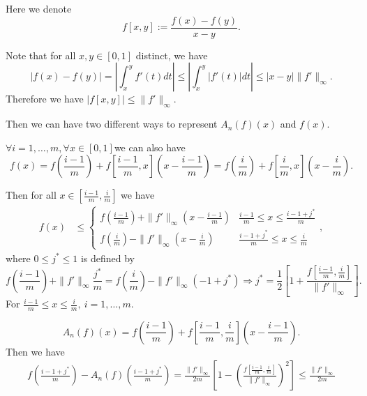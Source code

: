 Here we denote
$$f[x,y]:=\frac{f(x)-f(y)}{x-y}.$$

 Note that for all $x,y \in [0,1]$ distinct, we have
 $$|f(x)-f(y)|=\left|\int_{x}^{y}f'(t)dt\right|\leq \left|\int_{x}^{y}\left|f'(t)\right|dt\right|
 \leq |x-y|\|f'\|_{\infty}.$$
 Therefore we have $|f[x,y]|\leq \|f'\|_{\infty}.$
 
Then we can have two different ways to represent $A_{n}(f)(x)$ and $f(x).$ 

$\forall i=1,\ldots,m, \forall x \in [0,1]$we can also have
 $$f(x)=f\left(\frac{i-1}{m}\right)+f\left[\frac{i-1}{m},x\right]\left(x-\frac{i-1}{m}\right)=f\left(\frac{i}{m}\right)+f\left[\frac{i}{m},x\right]\left(x-\frac{i}{m}\right).$$



  Then for all $x \in \left[\frac{i-1}{m},\frac{i}{m}\right]$ we have
  \begin{align*}
  f(x)
  & \leq \left\{\begin{matrix}
  f\left(\frac{i-1}{m}\right)+\|f'\|_{\infty}\left(x-\frac{i-1}{m}\right) & \frac{i-1}{m} \leq x \leq \frac{i-1+j^{*}}{m} \\
  f\left(\frac{i}{m}\right)-\|f'\|_{\infty}\left(x-\frac{i}{m}\right) & \frac{i-1+j^{*}}{m} \leq x \leq \frac{i}{m}
  \end{matrix},\right.
  \end{align*}
where $0 \leq j^{*} \leq 1$ is defined by
$$f\left(\frac{i-1}{m}\right)+\|f'\|_{\infty}\frac{j^{*}}{m}=f\left(\frac{i}{m}\right)-\|f'\|_{\infty}\left(-1+j^{*}\right)
\Rightarrow j^{*}=\frac{1}{2}\left[1+\frac{f\left[\frac{i-1}{m},\frac{i}{m}\right]}{\|f'\|_{\infty}}\right].$$
For $\frac{i-1}{m} \leq x \leq \frac{i}{m}, \ i=1, \ldots, m.$

$$A_{n}(f)(x)=f\left(\frac{i-1}{m}\right)+f\left[\frac{i-1}{m},\frac{i}{m}\right]\left(x-\frac{i-1}{m}\right).$$
Then we have
\begin{align*}
f\left(\frac{i-1+j^{*}}{m}\right)-A_{n}(f)\left(\frac{i-1+j^{*}}{m}\right) 
=\frac{\|f'\|_{\infty}}{2m}\left[1-\left(\frac{f\left[\frac{i-1}{m},\frac{i}{m}\right]}{\|f'\|_{\infty}}\right)^{2}\right]\leq \frac{\|f'\|_{\infty}}{2m}
\end{align*}

